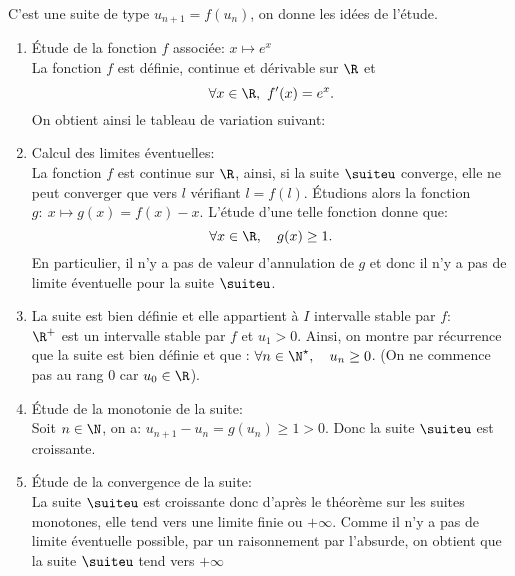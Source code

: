 \begin{correction} \;
C'est une suite de type $u_{n+1}=f(u_n)$, on donne les id\'ees de l'\'etude.
\begin{enumerate}
 \item \'Etude de la fonction $f$ associ\'ee: $x\mapsto e^x$\\
\noindent  La fonction $f$ est d\'efinie, continue et d\'erivable sur $\R$ et 
$$\forall x\in\R,\ f^{\prime}(x)=e^x.$$
On obtient ainsi le tableau de variation suivant:
\begin{center}
\end{center}
\item Calcul des limites \'eventuelles:\\
\noindent La fonction $f$ est continue sur $\R$, ainsi, si la suite $\suiteu$ converge, elle ne peut converger que vers $l$ v\'erifiant 
$l=f(l)$. 
\'Etudions alors la fonction $g:\ x\mapsto g(x)=f(x)-x$. L'\'etude d'une telle fonction donne que:
$$\forall x\in\R,\quad g(x)\geq 1.$$
En particulier, il n'y a pas de valeur d'annulation de $g$ et donc il n'y a pas de limite \'eventuelle pour la suite $\suiteu$.
\item La suite est bien d\'efinie et elle appartient \`{a} $I$ intervalle stable par $f$:\\
\noindent $\R^+$ est un intervalle stable par $f$ et $u_1>0$.
\noindent Ainsi, on montre par r\'ecurrence que la suite est bien d\'efinie et que : $\forall n\in\N^{\star},\quad u_n \geq 0$. (On ne commence pas au rang 0 car $u_0\in\R$).
\item \'Etude de la monotonie de la suite:\\
\noindent Soit $n\in\N$, on a: $u_{n+1}-u_n=g(u_n)\geq 1>0$. Donc la suite $\suiteu$ est croissante.
\item \'Etude de la convergence de la suite:\\
\noindent La suite $\suiteu$ est croissante donc d'apr\`es le th\'eor\`eme sur les suites monotones, elle tend vers une limite finie ou $+\infty$. Comme il n'y a pas de limite \'eventuelle possible, par un raisonnement par l'absurde, on obtient que la suite $\suiteu$ tend vers $+\infty$
\end{enumerate}
\end{correction}